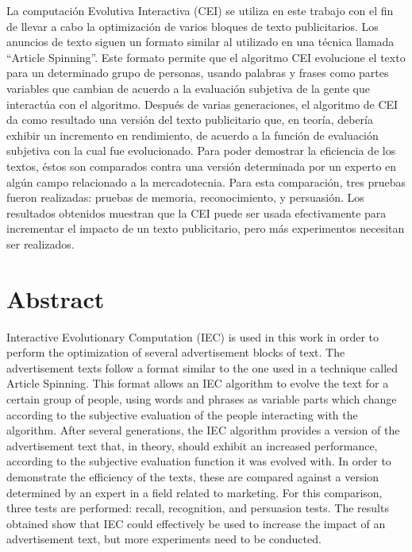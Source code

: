 % 
% 
%

La computación Evolutiva Interactiva (CEI) se utiliza en este trabajo con el fin de llevar a cabo la optimización de varios bloques de texto publicitarios. Los anuncios de texto siguen un formato similar al utilizado en una técnica llamada “Article Spinning”. Este formato permite que el algoritmo CEI evolucione el texto para un determinado grupo de personas, usando palabras y frases como partes variables que cambian de acuerdo a la evaluación subjetiva de la gente que interactúa con el algoritmo. Después de varias generaciones, el algoritmo de CEI da como resultado una versión del texto publicitario que, en teoría, debería exhibir un incremento en rendimiento, de acuerdo a la función de evaluación subjetiva con la cual fue evolucionado. Para poder demostrar la eficiencia de los textos, éstos son comparados contra una versión determinada por un experto en algún campo relacionado a la mercadotecnia. Para esta comparación, tres pruebas fueron realizadas: pruebas de memoria, reconocimiento, y persuasión. Los resultados obtenidos muestran que la CEI puede ser usada efectivamente para incrementar el impacto de un texto publicitario, pero más experimentos necesitan ser realizados.

\section*{Abstract}
Interactive Evolutionary Computation (IEC) is used in this work in order to perform the optimization of several advertisement blocks of text. The advertisement texts follow a format similar to the one used in a technique called Article Spinning. This format allows an IEC algorithm to evolve the text for a certain group of people, using words and phrases as variable parts which change according to the subjective evaluation of the people interacting with the algorithm. After several generations, the IEC algorithm provides a version of the advertisement text that, in theory, should exhibit an increased performance, according to the subjective evaluation function it was evolved with. In order to demonstrate the efficiency of the texts, these are compared against a version determined by an expert in a field related to marketing. For this comparison, three tests are performed: recall, recognition, and persuasion tests. The results obtained show that IEC could effectively be used to increase the impact of an advertisement text, but more experiments need to be conducted.
